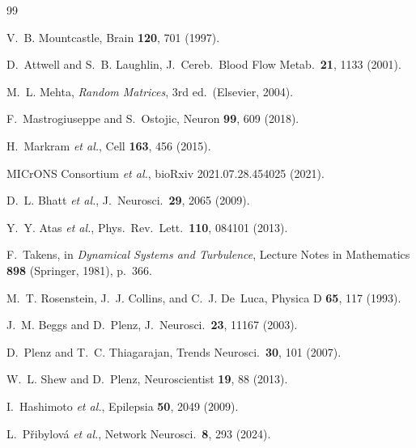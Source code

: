 \documentclass[aps,pre,twocolumn,showpacs,superscriptaddress,longbibliography]{revtex4-2}
\begin{document}
\begin{thebibliography}{99}

V.~B. Mountcastle,
Brain \textbf{120}, 701 (1997).

D.~Attwell and S.~B. Laughlin,
J.\ Cereb.\ Blood Flow Metab.\ \textbf{21}, 1133 (2001).

M.~L. Mehta,
\emph{Random Matrices}, 3rd ed.\ (Elsevier, 2004).

F.~Mastrogiuseppe and S.~Ostojic,
Neuron \textbf{99}, 609 (2018).

H.~Markram \emph{et al.},
Cell \textbf{163}, 456 (2015).

MICrONS Consortium \emph{et al.},
bioRxiv 2021.07.28.454025 (2021).

D.~L. Bhatt \emph{et al.},
J.\ Neurosci.\ \textbf{29}, 2065 (2009).

Y.~Y. Atas \emph{et al.},
Phys.\ Rev.\ Lett.\ \textbf{110}, 084101 (2013).

F.~Takens, in \emph{Dynamical Systems and Turbulence},
Lecture Notes in Mathematics \textbf{898} (Springer, 1981), p.~366.

M.~T. Rosenstein, J.~J. Collins, and C.~J. De~Luca,
Physica D \textbf{65}, 117 (1993).

J.~M. Beggs and D.~Plenz,
J.\ Neurosci.\ \textbf{23}, 11167 (2003).

D.~Plenz and T.~C. Thiagarajan,
Trends Neurosci.\ \textbf{30}, 101 (2007).

W.~L. Shew and D.~Plenz,
Neuroscientist \textbf{19}, 88 (2013).

I.~Hashimoto \emph{et al.},
Epilepsia \textbf{50}, 2049 (2009).

L.~P\v{r}ibylov\'a \emph{et al.},
Network Neurosci.\ \textbf{8}, 293 (2024).

\end{thebibliography}
\end{document}
